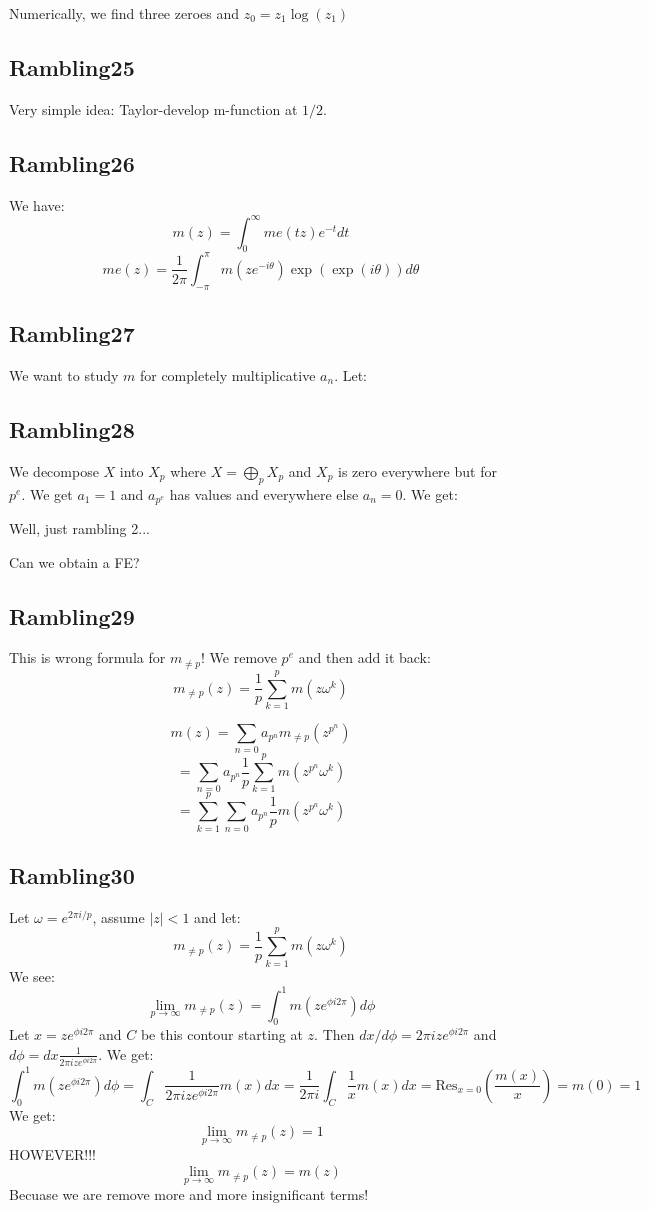 \documentclass[a4paper]{amsart}
\begin{document}
Numerically, we find three zeroes and $z_0 = z_1 \log(z_1)$

\subsection{Rambling25}
Very simple idea: Taylor-develop m-function at $1/2$. 

\subsection{Rambling26}
We have:
$$m(z) = \int_0^\infty me(tz) e^{-t} dt$$
$$me(z) = \frac{1}{2\pi} \int_{-\pi}^{\pi} m(ze^{-i\theta}) \exp(\exp(i\theta)) d\theta$$

\subsection{Rambling27}

We want to study $m$ for completely multiplicative $a_n$. Let: 
$$$$


\subsection{Rambling28}

We decompose $X$ into $X_p$ where $X = \bigoplus_p X_p$ and $X_p$ is zero everywhere but for $p^e$. We get $a_1 = 1$ and $a_{p^e}$ has values and everywhere else $a_n = 0$. We get:

Well, just rambling 2...

Can we obtain a FE?

\subsection{Rambling29}
This is wrong formula for $m_{\ne p}$!
We remove $p^e$ and then add it back:
$$m_{\ne p}(z) = \frac{1}{p} \sum_{k = 1}^p m(z \omega^k)$$

$$m(z) = \sum_{n = 0} a_{p^n} m_{\ne p}(z^{p^n})$$
$$ = \sum_{n = 0} a_{p^n} \frac{1}{p} \sum_{k = 1}^p m(z^{p^n} \omega^k)$$
$$ = \sum_{k = 1}^p \sum_{n = 0} a_{p^n} \frac{1}{p} m(z^{p^n} \omega^k)$$


\subsection{Rambling30}
Let $\omega = e^{2\pi i/p}$, assume $|z| < 1$ and let:
$$m_{\ne p}(z) = \frac{1}{p} \sum_{k = 1}^p m(z \omega^k)$$
We see: 
$$\lim_{p \to \infty} m_{\ne p}(z) = \int_{0}^{1} m(z e^{\phi i 2\pi}) d\phi$$
Let $x = ze^{\phi i 2\pi}$ and $C$ be this contour starting at $z$. Then $dx/d\phi = 2\pi ize^{\phi i 2\pi}$ and $d\phi = dx \frac{1}{2\pi ize^{\phi i 2\pi}}$. We get:
$$\int_{0}^{1} m(z e^{\phi i 2\pi}) d\phi = \int_C \frac{1}{2\pi ize^{\phi i 2\pi}} m(x) dx = \frac{1}{2\pi i}\int_C \frac{1}{x} m(x) dx = \text{Res}_{x = 0} (\frac{m(x)}{x}) = m(0) = 1$$
We get:
$$\lim_{p \to \infty} m_{\ne p}(z) = 1$$
HOWEVER!!!
$$\lim_{p \to \infty} m_{\ne p}(z) = m(z)$$
Becuase we are remove more and more insignificant terms!
\end{document}
